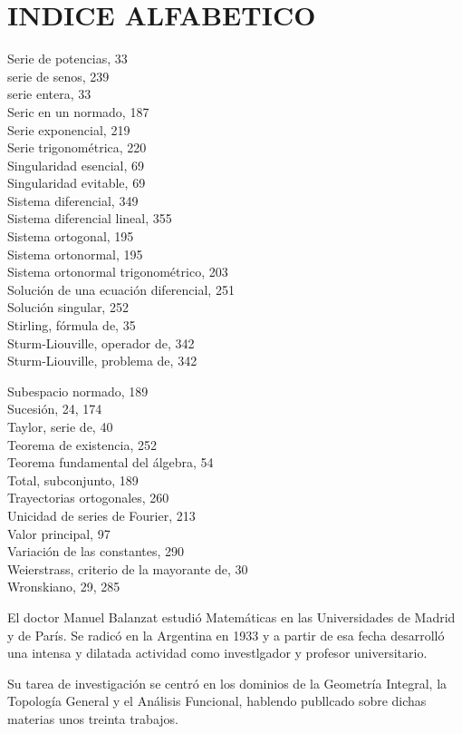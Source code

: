 \documentclass[10pt]{article}
\theoremstyle{plain}
\theoremstyle{definition}
\theoremstyle{remark}
\begin{document}
\section*{INDICE ALFABETICO}
Serie de potencias, 33\\
serie de senos, 239\\
serie entera, 33\\
Seric en un normado, 187\\
Serie exponencial, 219\\
Serie trigonométrica, 220\\
Singularidad esencial, 69\\
Singularidad evitable, 69\\
Sistema diferencial, 349\\
Sistema diferencial lineal, 355\\
Sistema ortogonal, 195\\
Sistema ortonormal, 195\\
Sistema ortonormal trigonométrico, 203\\
Solución de una ecuación diferencial, 251\\
Solución singular, 252\\
Stirling, fórmula de, 35\\
Sturm-Liouville, operador de, 342\\
Sturm-Liouville, problema de, 342

Subespacio normado, 189\\
Sucesión, 24, 174\\
Taylor, serie de, 40\\
Teorema de existencia, 252\\
Teorema fundamental del álgebra, 54\\
Total, subconjunto, 189\\
Trayectorias ortogonales, 260\\
Unicidad de series de Fourier, 213\\
Valor principal, 97\\
Variación de las constantes, 290\\
Weierstrass, criterio de la mayorante de, 30\\
Wronskiano, 29, 285

El doctor Manuel Balanzat estudió Matemáticas en las Universidades de Madrid y de París. Se radicó en la Argentina en 1933 y a partir de esa fecha desarrolló una intensa y dilatada actividad como investlgador y profesor universitario.

Su tarea de investigación se centró en los dominios de la Geometría Integral, la Topología General y el Análisis Funcional, hablendo publlcado sobre dichas materias unos treinta trabajos.
\end{document}
